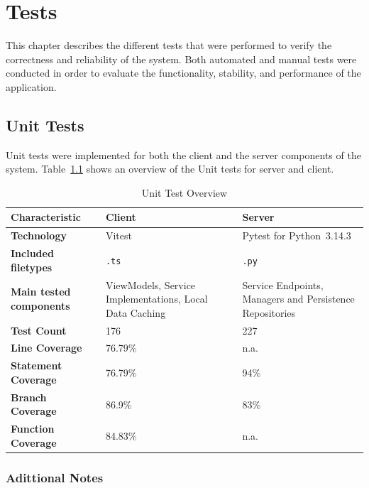 \chapter{Tests}

This chapter describes the different tests that were performed to verify the
correctness and reliability of the system.
Both automated and manual tests
were conducted in order to evaluate the functionality, stability, and
performance of the application.

\section{Unit Tests}
Unit tests were implemented for both the client and the server
components of the system.
Table~\ref{tab:unit-test-overview} shows an overview of the Unit tests for server and client.

\begin{table}[h]
    \center

    \begin{tabular}{|p{4cm}|p{6cm}|p{6cm}|}
        \hline
        \textbf{Characteristic} & \textbf{Client} & \textbf{Server} \\
        \hline
        \textbf{Technology} & Vitest & Pytest for Python~3.14.3 \\
        \hline
        \textbf{Included filetypes} & \texttt{.ts} & \texttt{.py} \\
        \hline
        \textbf{Main tested components} & ViewModels, Service Implementations, Local Data Caching & Service Endpoints, Managers and Persistence Repositories \\
        \hline
        \textbf{Test Count} & 176 & 227 \\
        \hline
        \textbf{Line Coverage} & 76.79\% & n.a. \\
        \hline
        \textbf{Statement Coverage} & 76.79\% & 94\% \\
        \hline
        \textbf{Branch Coverage} & 86.9\% & 83\% \\
        \hline
        \textbf{Function Coverage} & 84.83\% & n.a. \\
        \hline
    \end{tabular}

    \caption{Unit Test Overview}
    \label{tab:unit-test-overview}
\end{table}

\subsection{Adittional Notes}
